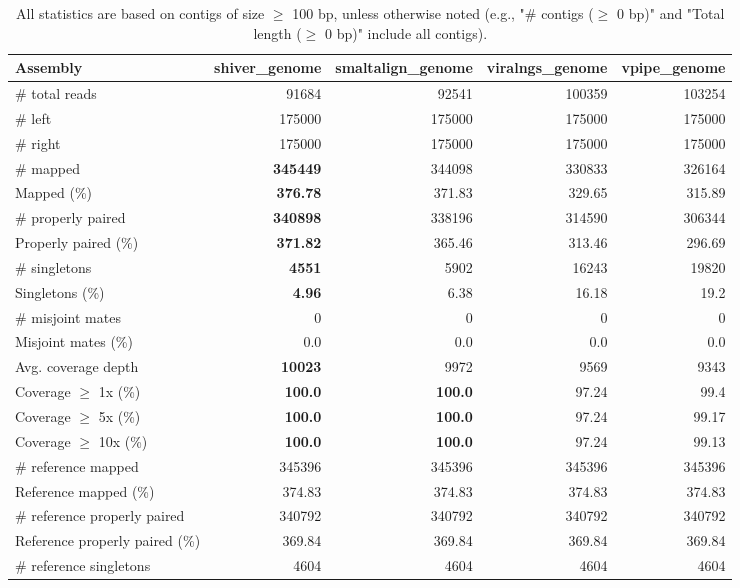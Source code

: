 \documentclass[12pt,a4paper]{article}
\begin{document}
\begin{table}[ht]
\begin{center}
\caption{All statistics are based on contigs of size $\geq$ 100 bp, unless otherwise noted (e.g., "\# contigs ($\geq$ 0 bp)" and "Total length ($\geq$ 0 bp)" include all contigs).}
\begin{tabular}{|l*{4}{|r}|}
\hline
Assembly & shiver\_genome & smaltalign\_genome & viralngs\_genome & vpipe\_genome \\ \hline
\# total reads & 91684 & 92541 & 100359 & 103254 \\ \hline
\# left & 175000 & 175000 & 175000 & 175000 \\ \hline
\# right & 175000 & 175000 & 175000 & 175000 \\ \hline
\# mapped & {\bf 345449} & 344098 & 330833 & 326164 \\ \hline
Mapped (\%) & {\bf 376.78} & 371.83 & 329.65 & 315.89 \\ \hline
\# properly paired & {\bf 340898} & 338196 & 314590 & 306344 \\ \hline
Properly paired (\%) & {\bf 371.82} & 365.46 & 313.46 & 296.69 \\ \hline
\# singletons & {\bf 4551} & 5902 & 16243 & 19820 \\ \hline
Singletons (\%) & {\bf 4.96} & 6.38 & 16.18 & 19.2 \\ \hline
\# misjoint mates & 0 & 0 & 0 & 0 \\ \hline
Misjoint mates (\%) & 0.0 & 0.0 & 0.0 & 0.0 \\ \hline
Avg. coverage depth & {\bf 10023} & 9972 & 9569 & 9343 \\ \hline
Coverage $\geq$ 1x (\%) & {\bf 100.0} & {\bf 100.0} & 97.24 & 99.4 \\ \hline
Coverage $\geq$ 5x (\%) & {\bf 100.0} & {\bf 100.0} & 97.24 & 99.17 \\ \hline
Coverage $\geq$ 10x (\%) & {\bf 100.0} & {\bf 100.0} & 97.24 & 99.13 \\ \hline
\# reference mapped & 345396 & 345396 & 345396 & 345396 \\ \hline
Reference mapped (\%) & 374.83 & 374.83 & 374.83 & 374.83 \\ \hline
\# reference properly paired & 340792 & 340792 & 340792 & 340792 \\ \hline
Reference properly paired (\%) & 369.84 & 369.84 & 369.84 & 369.84 \\ \hline
\# reference singletons & 4604 & 4604 & 4604 & 4604 \\ \hline

\end{tabular}
\end{center}
\end{table}
\end{document}

